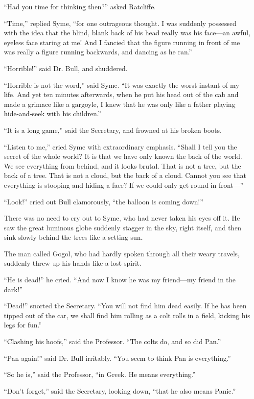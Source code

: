 “Had you time for thinking then?” asked Ratcliffe.

“Time,” replied Syme, “for one outrageous thought. I was suddenly possessed with the idea that the blind, blank back of his head really was his face⁠—an awful, eyeless face staring at me! And I fancied that the figure running in front of me was really a figure running backwards, and dancing as he ran.”

“Horrible!” said Dr. Bull, and shuddered.

“Horrible is not the word,” said Syme. “It was exactly the worst instant of my life. And yet ten minutes afterwards, when he put his head out of the cab and made a grimace like a gargoyle, I knew that he was only like a father playing hide-and-seek with his children.”

“It is a long game,” said the Secretary, and frowned at his broken boots.

“Listen to me,” cried Syme with extraordinary emphasis. “Shall I tell you the secret of the whole world? It is that we have only known the back of the world. We see everything from behind, and it looks brutal. That is not a tree, but the back of a tree. That is not a cloud, but the back of a cloud. Cannot you see that everything is stooping and hiding a face? If we could only get round in front⁠—”

“Look!” cried out Bull clamorously, “the balloon is coming down!”

There was no need to cry out to Syme, who had never taken his eyes off it. He saw the great luminous globe suddenly stagger in the sky, right itself, and then sink slowly behind the trees like a setting sun.

The man called Gogol, who had hardly spoken through all their weary travels, suddenly threw up his hands like a lost spirit.

“He is dead!” he cried. “And now I know he was my friend⁠—my friend in the dark!”

“Dead!” snorted the Secretary. “You will not find him dead easily. If he has been tipped out of the car, we shall find him rolling as a colt rolls in a field, kicking his legs for fun.”

“Clashing his hoofs,” said the Professor. “The colts do, and so did Pan.”

“Pan again!” said Dr. Bull irritably. “You seem to think Pan is everything.”

“So he is,” said the Professor, “in Greek. He means everything.”

“Don’t forget,” said the Secretary, looking down, “that he also means Panic.”


